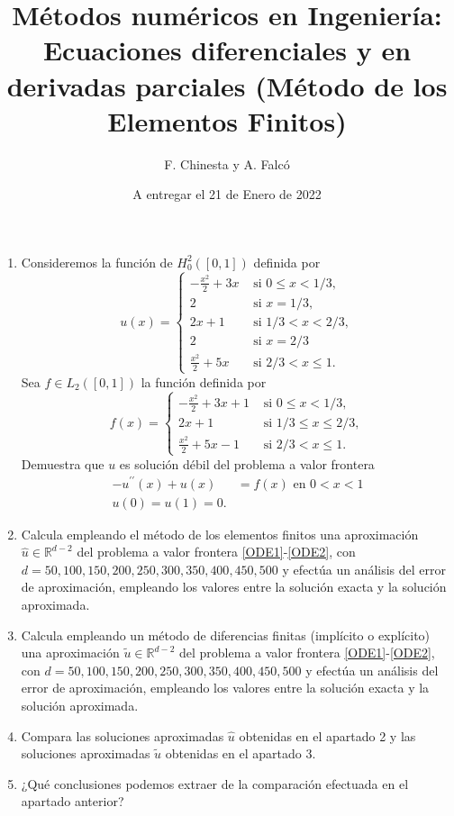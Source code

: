 \documentclass[a4paper,10pt]{article}
\begin{document}
\title{Métodos numéricos en Ingeniería: Ecuaciones diferenciales y en derivadas parciales (Método de los Elementos Finitos)}
\author{F. Chinesta y A. Falcó}
\date{A entregar el 21 de Enero de 2022}
\maketitle

\begin{enumerate}
\item Consideremos la función de $H_0^2([0,1])$ definida por
$$
u(x)= \left\{
\begin{array}{cc}
-\frac{x^2}{2}+3x & \text{ si } 0 \le x < 1/3, \\ 
2 & \text{ si } x=1/3, \\ 
2x +1 & \text{ si } 1/3 < x < 2/3, \\ 
2 & \text{ si } x= 2/3 \\ 
\frac{x^2}{2}+5x & \text{ si } 2/3 < x \le 1.
\end{array}
\right.
$$
Sea $f \in L_2([0,1])$ la función definida por
$$
f(x)= \left\{
\begin{array}{cc}
-\frac{x^2}{2}+3x +1 & \text{ si } 0 \le x < 1/3, \\ 
2x +1 & \text{ si } 1/3 \le  x \le   2/3, \\ 
\frac{x^2}{2}+5x -1& \text{ si } 2/3 <  x \le 1.
\end{array}
\right.
$$
Demuestra que $u$ es solución débil del problema a valor frontera 
\begin{align}
- u^{\prime \prime}(x) + u(x) & = f(x) \text{ en } 0 < x < 1 \label{ODE1} \\ 
 u(0) = u(1) = 0.  \label{ODE2}
\end{align}
\item Calcula empleando el método de los elementos finitos una aproximación 
$\widehat{u} \in \mathbb{R}^{d-2}$ del problema a valor frontera \eqref{ODE1}-\eqref{ODE2}, con
$d=50,100,150,200,250,300,350,400,450,500$ y efectúa un análisis del error de aproximación, empleando
los valores entre la solución exacta y la solución aproximada.
\item Calcula empleando un método de diferencias finitas (implícito o explícito) una aproximación 
$\tilde{u} \in \mathbb{R}^{d-2}$ del problema a valor frontera \eqref{ODE1}-\eqref{ODE2}, con
$d=50,100,150,200,250,300,350,400,450,500$ y efectúa un análisis del error de aproximación, empleando
los valores entre la solución exacta y la solución aproximada.
\item Compara las soluciones aproximadas $\widehat{u}$ obtenidas en el apartado 2 y las soluciones aproximadas 
$\tilde{u}$ obtenidas en el apartado 3.
\item ¿Qué conclusiones podemos extraer de la comparación efectuada en el apartado anterior? 
\end{enumerate}
\end{document}
